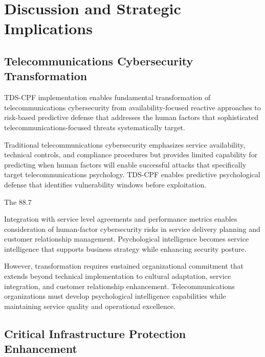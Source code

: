 \documentclass[10pt, twocolumn]{article}
\begin{document}
\section{Discussion and Strategic Implications}

\subsection{Telecommunications Cybersecurity Transformation}

TDS-CPF implementation enables fundamental transformation of telecommunications cybersecurity from availability-focused reactive approaches to risk-based predictive defense that addresses the human factors that sophisticated telecommunications-focused threats systematically target.

Traditional telecommunications cybersecurity emphasizes service availability, technical controls, and compliance procedures but provides limited capability for predicting when human factors will enable successful attacks that specifically target telecommunications psychology. TDS-CPF enables predictive psychological defense that identifies vulnerability windows before exploitation.

The 88.7%

Integration with service level agreements and performance metrics enables consideration of human-factor cybersecurity risks in service delivery planning and customer relationship management. Psychological intelligence becomes service intelligence that supports business strategy while enhancing security posture.

However, transformation requires sustained organizational commitment that extends beyond technical implementation to cultural adaptation, service integration, and customer relationship enhancement. Telecommunications organizations must develop psychological intelligence capabilities while maintaining service quality and operational excellence.

\subsection{Critical Infrastructure Protection Enhancement}
\end{document}

